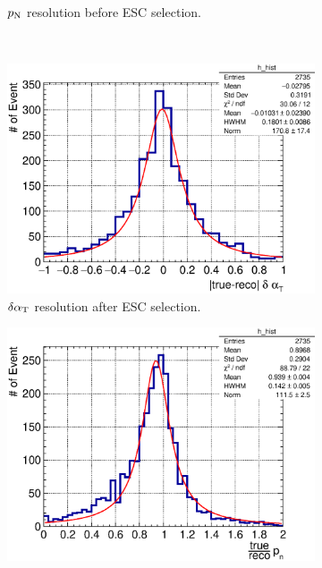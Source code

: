 \begin{figure}[!htb]
\begin{subfigure}{0.45\textwidth}
                \caption{$p_\textrm{N}$ resolution before ESC selection.}
                \label{fig:pn-res-bfESC}
           \end{subfigure}
           \\
            \begin{subfigure}{0.45\textwidth}
                \includegraphics[width=\textwidth]{figures/dalphat_rat_hist_al14.eps}
                \caption{$\delta\alpha_\textrm{T}$ resolution after ESC selection.}
                \label{fig:dat-res-afESC}
           \end{subfigure}
           \begin{subfigure}{0.45\textwidth}
                \includegraphics[width=\textwidth]{figures/pn_rat_hist_al14.eps}

\end{subfigure}
\end{figure}

